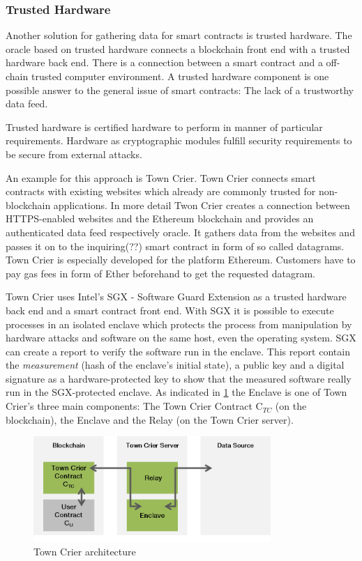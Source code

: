 \documentclass[conference]{IEEEtran}
\begin{document}
\subsubsection{Trusted Hardware}
Another solution for gathering data for smart contracts is trusted hardware. The oracle based on trusted hardware connects a blockchain front end with a trusted hardware back end. There is a connection between a smart contract and a off-chain trusted computer environment. A trusted hardware component is one possible answer to the general issue of smart contracts: The lack of a trustworthy data feed. \cite{Zhang2016} \par 
Trusted hardware is certified hardware to perform in manner of particular requirements. Hardware as cryptographic modules fulfill security requirements to be secure from external attacks. \cite{Sion2009} \par 
An example for this approach is Town Crier. Town Crier connects smart contracts with existing websites which already are commonly trusted for non-blockchain applications. In more detail Twon Crier creates a connection between HTTPS-enabled websites and the Ethereum blockchain and provides an authenticated data feed respectively oracle. It gathers data from the websites and passes it on to the inquiring(??) smart contract in form of so called datagrams. Town Crier is especially developed for the platform Ethereum. Customers have to pay gas fees in form of Ether beforehand to get the requested datagram. \cite{Zhang2016} \par 
Town Crier uses Intel’s SGX - Software Guard Extension as a trusted hardware back end and a smart contract front end. With SGX it is possible to execute processes in an isolated enclave which protects the process from manipulation by hardware attacks and software on the same host, even the operating system. SGX can create a report to verify the software run in the enclave. This report contain the \textit{measurement} (hash of the enclave's initial state), a public key and a digital signature as a hardware-protected key to show that the measured software really run in the SGX-protected enclave. As indicated in \ref{towncrier} the Enclave is one of Town Crier's three main components: The Town Crier Contract C$_{TC}$ (on the blockchain), the Enclave and the Relay (on the Town Crier server). 
\begin{figure}[h]
	\begin{center}
		\includegraphics[width=9cm]{TownCrier.png}
		\caption{Town Crier architecture}
		\label{towncrier}
	\end{center}
\end{figure}
\end{document}
